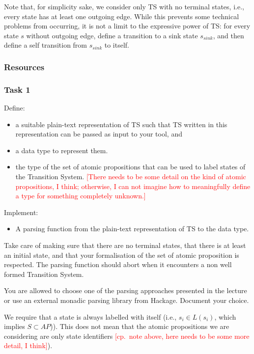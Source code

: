 \documentclass{article}
\begin{document}
Note that, for simplicity sake, we consider only TS with no terminal states, i.e., every state has at least 
one outgoing edge. While this prevents some technical problems from occurring, it is not a limit to the 
expressive power of TS: for every state $s$ without outgoing edge, define a transition to a sink state 
$s_ {sink}$, and then define a self transition from $s_ {sink}$ to itself.

\subsubsection*{Resources}
\cite[Paragraph 2.1]{BaKa}

\subsubsection*{Task 1}
Define:
\begin{itemize}
    \item a suitable plain-text representation of TS such that TS written in this representation
          can be passed as input to your tool, and
    \item a data type to represent them. 
    \item the type of the set of atomic propositions that can be used to label states of the Transition System.
          \textcolor{red}{[There needs to be some detail on the kind of atomic propositions, I think; 
          otherwise, I can not imagine how to meaningfully define a type for something completely unknown.]}
\end{itemize}
Implement: 
\begin{itemize}
    \item A parsing function from the plain-text representation of TS to the data type.
\end{itemize}
Take care of making sure that there are no terminal states, that there is at least an initial state, 
and that your formalisation of the set of atomic proposition is respected. The parsing function should 
abort when it encounters a non well formed Transition System.

You are allowed to choose one of the parsing approaches presented in the lecture or 
use an external monadic parsing library from Hackage. Document your choice.

We require that a state is always labelled with itself 
(i.e., $s_i \in L(s_i)$, which implies $S \subset AP$)). This does not mean that the atomic propositions 
we are considering are only state identifiers \textcolor{red}{[cp.~note above, here needs to be some
more detail, I think]}).
\end{document}

